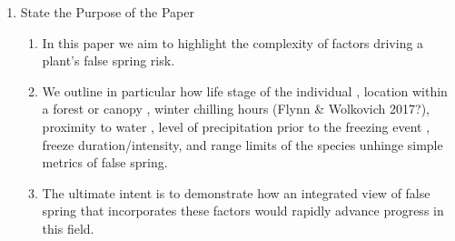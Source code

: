 \documentclass{article}\usepackage[]{graphicx}\usepackage[]{color}
\begin{document}
\begin{enumerate}
\item State the Purpose of the Paper
\begin{enumerate}
\item In this paper we aim to highlight the complexity of factors driving a plant's false spring risk. 
\item We outline in particular how life stage of the individual \citep{Caffarra2011}, location within a forest or canopy \citep{Augspurger2013}, winter chilling hours (Flynn \& Wolkovich 2017?), proximity to water \citep{Gu2008}, level of precipitation prior to the freezing event \citep{Anderegg2013}, freeze duration/intensity, and range limits of the species \citep{Martin2010} unhinge simple metrics of false spring. 
\item The ultimate intent is to demonstrate how an integrated view of false spring that incorporates these factors would rapidly advance progress in this field.  
\end{enumerate}
\end{enumerate}

\end{document}
